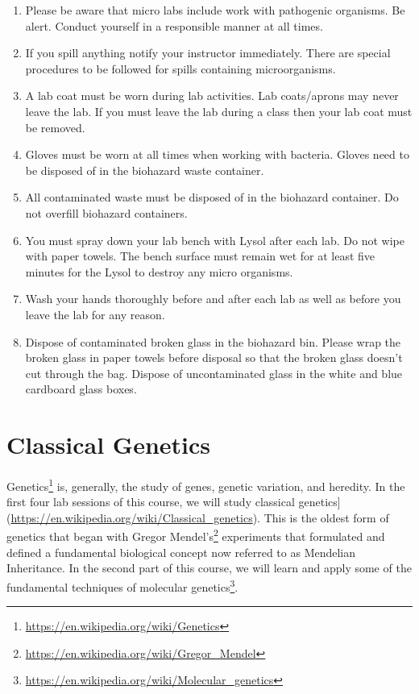 \documentclass[]{book}
\providecommand{\tightlist}{%
  \setlength{\itemsep}{0pt}\setlength{\parskip}{0pt}}
\let\rmarkdownfootnote\footnote%
\def\footnote{\protect\rmarkdownfootnote}
\renewcommand{\href}[2]{#2\footnote{\url{#1}}}
\theoremstyle{definition}
\theoremstyle{definition}
\theoremstyle{definition}
\theoremstyle{remark}
\begin{document}
\begin{enumerate}
\def\labelenumi{\arabic{enumi}.}
\setcounter{enumi}{37}
\tightlist
\item
  Please be aware that micro labs include work with pathogenic
  organisms. Be alert. Conduct yourself in a responsible manner at all
  times.
\item
  If you spill anything notify your instructor immediately. There are
  special procedures to be followed for spills containing
  microorganisms.
\item
  A lab coat must be worn during lab activities. Lab coats/aprons may
  never leave the lab. If you must leave the lab during a class then
  your lab coat must be removed.
\item
  Gloves must be worn at all times when working with bacteria. Gloves
  need to be disposed of in the biohazard waste container.
\item
  All contaminated waste must be disposed of in the biohazard container.
  Do not overfill biohazard containers.
\item
  You must spray down your lab bench with Lysol after each lab. Do not
  wipe with paper towels. The bench surface must remain wet for at least
  five minutes for the Lysol to destroy any micro organisms.
\item
  Wash your hands thoroughly before and after each lab as well as before
  you leave the lab for any reason.
\item
  Dispose of contaminated broken glass in the biohazard bin. Please wrap
  the broken glass in paper towels before disposal so that the broken
  glass doesn't cut through the bag. Dispose of uncontaminated glass in
  the white and blue cardboard glass boxes.
\end{enumerate}

\chapter*{Classical Genetics}\label{classical-genetics}

\href{https://en.wikipedia.org/wiki/Genetics}{Genetics} is, generally,
the study of genes, genetic variation, and heredity. In the first four
lab sessions of this course, we will study classical
genetics{]}(\url{https://en.wikipedia.org/wiki/Classical_genetics}).
This is the oldest form of genetics that began with
\href{https://en.wikipedia.org/wiki/Gregor_Mendel}{Gregor Mendel's}
experiments that formulated and defined a fundamental biological concept
now referred to as Mendelian Inheritance. In the second part of this
course, we will learn and apply some of the fundamental techniques of
\href{https://en.wikipedia.org/wiki/Molecular_genetics}{molecular
genetics}.
\end{document}
